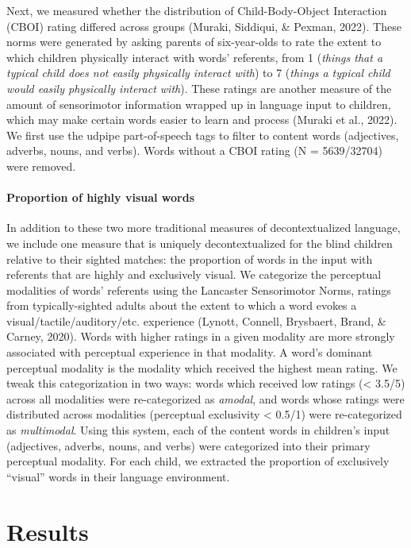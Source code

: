 \documentclass[
  man]{apa6}
\let\oldparagraph\paragraph
\renewcommand{\paragraph}[1]{\oldparagraph{#1}\mbox{}}
\begin{document}
Next, we measured whether the distribution of Child-Body-Object Interaction (CBOI) rating differed across groups (Muraki, Siddiqui, \& Pexman, 2022). These norms were generated by asking parents of six-year-olds to rate the extent to which children physically interact with words' referents, from 1 (\emph{things that a typical child does not easily physically interact with}) to 7 (\emph{things a typical child would easily physically interact with}). These ratings are another measure of the amount of sensorimotor information wrapped up in language input to children, which may make certain words easier to learn and process (Muraki et al., 2022). We first use the udpipe part-of-speech tags to filter to content words (adjectives, adverbs, nouns, and verbs). Words without a CBOI rating (N = 5639/32704) were removed.

\hypertarget{proportion-of-highly-visual-words}{%
\paragraph{Proportion of highly visual words}\label{proportion-of-highly-visual-words}}

In addition to these two more traditional measures of decontextualized language, we include one measure that is uniquely decontextualized for the blind children relative to their sighted matches: the proportion of words in the input with referents that are highly and exclusively visual. We categorize the perceptual modalities of words' referents using the Lancaster Sensorimotor Norms, ratings from typically-sighted adults about the extent to which a word evokes a visual/tactile/auditory/etc. experience (Lynott, Connell, Brysbaert, Brand, \& Carney, 2020). Words with higher ratings in a given modality are more strongly associated with perceptual experience in that modality. A word's dominant perceptual modality is the modality which received the highest mean rating. We tweak this categorization in two ways: words which received low ratings (\textless{} 3.5/5) across all modalities were re-categorized as \emph{amodal}, and words whose ratings were distributed across modalities (perceptual exclusivity \textless{} 0.5/1) were re-categorized as \emph{multimodal}. Using this system, each of the content words in children's input (adjectives, adverbs, nouns, and verbs) were categorized into their primary perceptual modality. For each child, we extracted the proportion of exclusively ``visual'' words in their language environment.

\hypertarget{results}{%
\section{Results}\label{results}}
\end{document}
